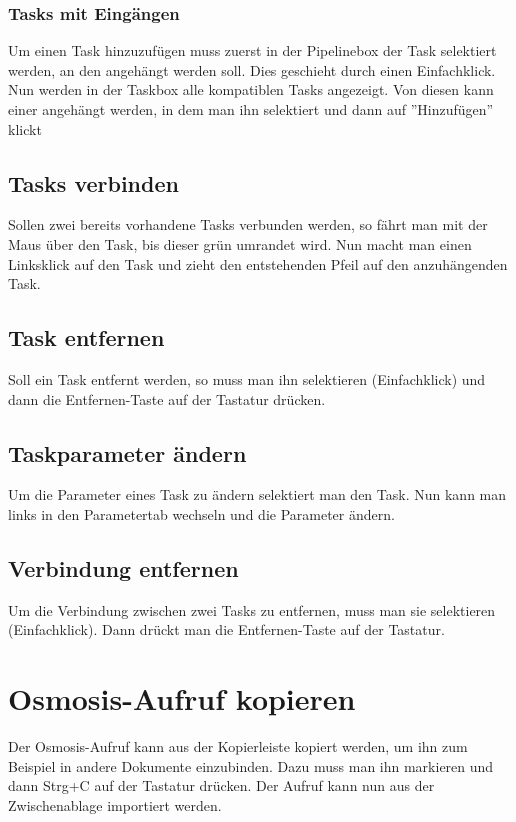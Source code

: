 \documentclass[a4paper,10pt]{scrartcl}
\begin{document}
\subsubsection{Tasks mit Eingängen}
Um einen Task hinzuzufügen muss zuerst in der Pipelinebox der Task selektiert werden, an den angehängt werden soll. Dies geschieht durch einen Einfachklick. Nun werden in der Taskbox alle kompatiblen Tasks angezeigt. Von diesen kann einer angehängt werden, in dem man ihn selektiert und dann auf ''Hinzufügen'' klickt
\subsection{Tasks verbinden}
Sollen zwei bereits vorhandene Tasks verbunden werden, so fährt man mit der Maus über den Task, bis dieser grün umrandet wird. Nun macht man einen Linksklick auf den Task und zieht den entstehenden Pfeil auf den anzuhängenden Task.
\subsection{Task entfernen}
Soll ein Task entfernt werden, so muss man ihn selektieren (Einfachklick) und dann die Entfernen-Taste auf der Tastatur drücken. 
\subsection{Taskparameter ändern}
Um die Parameter eines Task zu ändern selektiert man den Task. Nun kann man links in den Parametertab wechseln und die Parameter ändern.
\subsection{Verbindung entfernen}
Um die Verbindung zwischen zwei Tasks zu entfernen, muss man sie selektieren (Einfachklick). Dann drückt man die Entfernen-Taste auf der Tastatur. 

\section{Osmosis-Aufruf kopieren}
Der Osmosis-Aufruf kann aus der Kopierleiste kopiert werden, um ihn zum Beispiel in andere Dokumente einzubinden. Dazu muss man ihn markieren und dann Strg+C auf der Tastatur drücken. Der Aufruf kann nun aus der Zwischenablage importiert werden.

\end{document}
